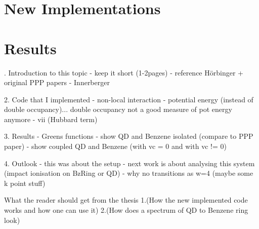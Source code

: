 \documentclass[oneside]{scrbook}			%
\begin{document}
\chapter{New Implementations}




%
\chapter{Results}



. Introduction to this topic
    - keep it short (1-2pages)
    - reference Hörbinger + original PPP papers
    - Innerberger
    
 2. Code that I implemented
    - non-local interaction
    - potential energy (instead of double occupancy)... double occupancy not a good measure of pot energy anymore
    - vii (Hubbard term)

3. Results
    - Greens functions
    - show QD and Benzene isolated (compare to PPP paper)
    - show coupled QD and Benzene (with vc = 0 and with vc != 0)
    
4. Outlook
    - this was about the setup
    - next work is about analysing this system (impact ionisation on BzRing or QD)
    - why no transitions as w=4 (maybe some k point stuff)
    
What the reader should get from the thesis
1.(How the new implemented code works and how one can use it)
2.(How does a spectrum of QD to Benzene ring look)

\newpage

 

\newpage

\end{document}

